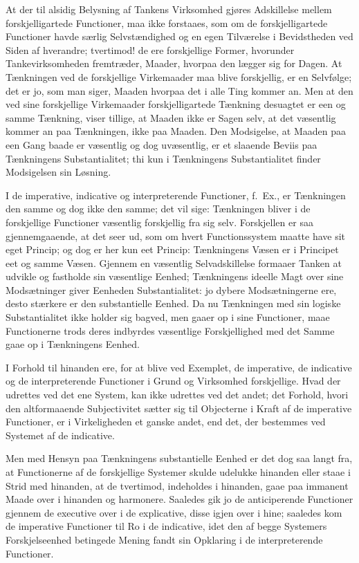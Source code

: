 \documentclass[12pt]{book}
\newcommand{\opage}[1]{\marginnote{\footnotesize\textit{[#1]}}}
\begin{document}
At der til alsidig Belysning af Tankens Virksomhed
gjøres Adskillelse mellem forskjelligartede Functioner, maa ikke
forstaaes, som om de forskjelligartede Functioner havde særlig
Selvstændighed og en egen Tilværelse i Bevidstheden ved
Siden af hverandre; tvertimod! de ere forskjellige Former,
hvorunder Tankevirksomheden fremtræder, Maader, hvorpaa
den lægger sig for Dagen. At Tænkningen ved de forskjellige
Virkemaader maa blive forskjellig, er en Selvfølge; det
er jo, som man siger, Maaden hvorpaa det i alle Ting kommer
an. Men at den ved sine forskjellige Virkemaader forskjelligartede
Tænkning desuagtet er een og samme Tænkning, viser
tillige, at Maaden ikke er Sagen selv, at det væsentlig kommer
an paa Tænkningen, ikke paa Maaden. Den Modsigelse, at
\opage{177}Maaden paa een Gang baade er væsentlig og dog uvæsentlig,
er et slaaende Beviis paa Tænkningens Substantialitet; thi
kun i Tænkningens Substantialitet finder Modsigelsen sin
Løsning.

I de imperative, indicative og interpreterende Functioner,
f.\ Ex., er Tænkningen den samme og dog ikke den samme; det
vil sige: Tænkningen bliver i de forskjellige Functioner væsentlig
forskjellig fra sig selv. Forskjellen er saa gjennemgaaende,
at det seer ud, som om hvert Functionssystem maatte
have sit eget Princip; og dog er her kun eet Princip: Tænkningens
Væsen er i Principet eet og samme Væsen. Gjennem
en væsentlig Selvadskillelse formaaer Tanken at udvikle og
fastholde sin væsentlige Eenhed; Tænkningens ideelle Magt
over sine Modsætninger giver Eenheden Substantialitet: jo
dybere Modsætningerne ere, desto stærkere er den substantielle
Eenhed. Da nu Tænkningen med sin logiske Substantialitet
ikke holder sig bagved, men gaaer op i sine Functioner, maae
Functionerne trods deres indbyrdes væsentlige Forskjellighed
med det Samme gaae op i Tænkningens Eenhed.

I Forhold til hinanden ere, for at blive ved Exemplet,
de imperative, de indicative og de interpreterende Functioner
i Grund og Virksomhed forskjellige. Hvad der udrettes ved det
ene System, kan ikke udrettes ved det andet; det Forhold,
hvori den altformaaende Subjectivitet sætter sig til Objecterne i
Kraft af de imperative Functioner, er i Virkeligheden et ganske
andet, end det, der bestemmes ved Systemet af de indicative.

Men med Hensyn paa Tænkningens substantielle Eenhed
er det dog saa langt fra, at Functionerne af de forskjellige
Systemer skulde udelukke hinanden eller staae i Strid
med hinanden, at de tvertimod, indeholdes i hinanden, gaae
paa immanent Maade over i hinanden og harmonere. Saaledes
gik jo de anticiperende Functioner gjennem de executive
over i de explicative, disse igjen over i hine; saaledes kom de
imperative Functioner til Ro i de indicative, idet den af
\opage{178}begge Systemers Forskjelseenhed betingede Mening fandt sin
Opklaring i de interpreterende Functioner.
\end{document}
